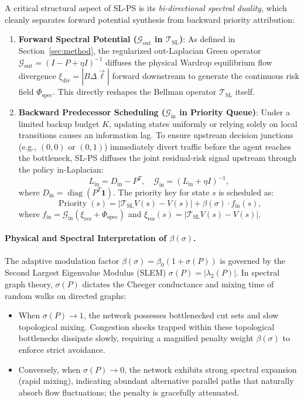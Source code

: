 \documentclass[11pt,a4paper]{article}
\begin{document}
A critical structural aspect of SL-PS is its \textit{bi-directional spectral duality}, which cleanly separates forward potential synthesis from backward priority attribution:
\begin{enumerate}
    \item \textbf{Forward Spectral Potential ($\mathcal{G}_{\text{out}}$ in $\mathcal{T}_{\text{SL}}$)}: As defined in Section~\ref{sec:method}, the regularized out-Laplacian Green operator $\mathcal{G}_{\text{out}} = (I - P + \eta I)^{-1}$ diffuses the physical Wardrop equilibrium flow divergence $\xi_{\text{div}} = |B \Delta \vec{\ell}|$ forward downstream to generate the continuous risk field $\Phi_{\text{spec}}$. This directly reshapes the Bellman operator $\mathcal{T}_{\text{SL}}$ itself.
    \item \textbf{Backward Predecessor Scheduling ($\mathcal{G}_{\text{in}}$ in Priority Queue)}: Under a limited backup budget $K$, updating states uniformly or relying solely on local transitions causes an information lag. To ensure upstream decision junctions (e.g., $(0, 0)$ or $(0, 1)$) immediately divert traffic before the agent reaches the bottleneck, SL-PS diffuses the joint residual-risk signal upstream through the policy in-Laplacian:
    \begin{equation}
    L_{\text{in}} = D_{\text{in}} - P^T, \quad \mathcal{G}_{\text{in}} = (L_{\text{in}} + \eta I)^{-1},
    \end{equation}
    where $D_{\text{in}} = \operatorname{diag}(P^T \mathbf{1})$. The priority key for state $s$ is scheduled as:
    \begin{equation}
    \operatorname{Priority}(s) = |\mathcal{T}_{\text{SL}} V(s) - V(s)| + \beta(\sigma) \cdot f_{\text{in}}(s),
    \end{equation}
    where $f_{\text{in}} = \mathcal{G}_{\text{in}} (\xi_{\text{res}} + \Phi_{\text{spec}})$ and $\xi_{\text{res}}(s) = |\mathcal{T}_{\text{SL}} V(s) - V(s)|$.
\end{enumerate}

\paragraph{Physical and Spectral Interpretation of $\beta(\sigma)$.}
The adaptive modulation factor $\beta(\sigma) = \beta_0 (1 + \sigma(P))$ is governed by the Second Largest Eigenvalue Modulus (SLEM) $\sigma(P) = |\lambda_2(P)|$. In spectral graph theory, $\sigma(P)$ dictates the Cheeger conductance and mixing time of random walks on directed graphs:
\begin{itemize}
    \item When $\sigma(P) \to 1$, the network possesses bottlenecked cut sets and slow topological mixing. Congestion shocks trapped within these topological bottlenecks dissipate slowly, requiring a magnified penalty weight $\beta(\sigma)$ to enforce strict avoidance.
    \item Conversely, when $\sigma(P) \to 0$, the network exhibits strong spectral expansion (rapid mixing), indicating abundant alternative parallel paths that naturally absorb flow fluctuations; the penalty is gracefully attenuated.
\end{itemize}
\end{document}
